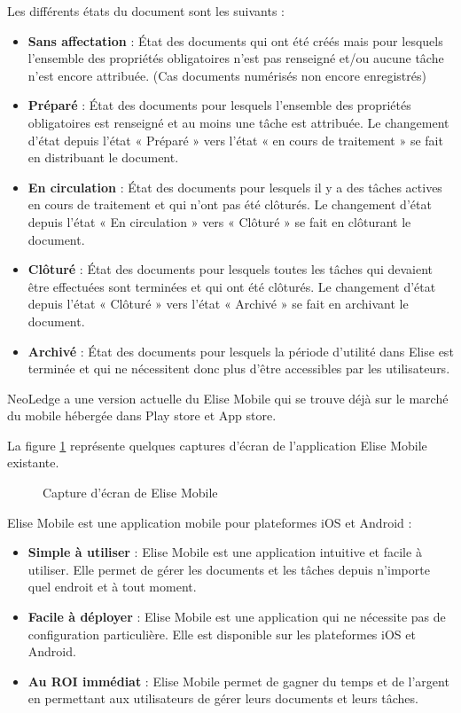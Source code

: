 Les différents états du document sont les suivants :

\begin{itemize}

\item \textbf{Sans affectation} : État des documents qui ont été créés mais pour lesquels l'ensemble des propriétés obligatoires n'est pas renseigné et/ou aucune tâche n'est encore attribuée. (Cas documents numérisés non encore enregistrés)
\item \textbf{Préparé} : État des documents pour lesquels l'ensemble des propriétés obligatoires est renseigné et au moins une tâche est attribuée. Le changement d'état depuis l'état « Préparé » vers l'état « en cours de traitement » se fait en distribuant le document.
\item \textbf{En circulation} : État des documents pour lesquels il y a des tâches actives en cours de traitement et qui n'ont pas été clôturés. Le changement d'état depuis l'état « En circulation » vers « Clôturé » se fait en clôturant le document.
\item \textbf{Clôturé} : État des documents pour lesquels toutes les tâches qui devaient être effectuées sont terminées et qui ont été clôturés. Le changement d'état depuis l'état « Clôturé » vers l'état « Archivé » se fait en archivant le document.
\item \textbf{Archivé} : État des documents pour lesquels la période d'utilité dans Elise est terminée et qui ne nécessitent donc plus d'être accessibles par les utilisateurs.

\end{itemize}

NeoLedge a une version actuelle du Elise Mobile qui se trouve déjà sur le marché du mobile hébergée dans Play store et App store.

La figure \ref{fig:captureEliseMobile} représente quelques captures d'écran de l'application Elise Mobile existante.\\

\begin{figure}[!h]
\centering
{}
\caption{Capture d'écran de Elise Mobile}
\label{fig:captureEliseMobile}
\end{figure}

Elise Mobile est une application mobile pour plateformes iOS et Android :

\begin{itemize}
\item \textbf{Simple à utiliser} : Elise Mobile est une application intuitive et facile à utiliser. Elle permet de gérer les documents et les tâches depuis n'importe quel endroit et à tout moment.
\item \textbf{Facile à déployer} : Elise Mobile est une application qui ne nécessite pas de configuration particulière. Elle est disponible sur les plateformes iOS et Android.
\item \textbf{Au ROI immédiat} : Elise Mobile permet de gagner du temps et de l'argent en permettant aux utilisateurs de gérer leurs documents et leurs tâches.
\end{itemize}

